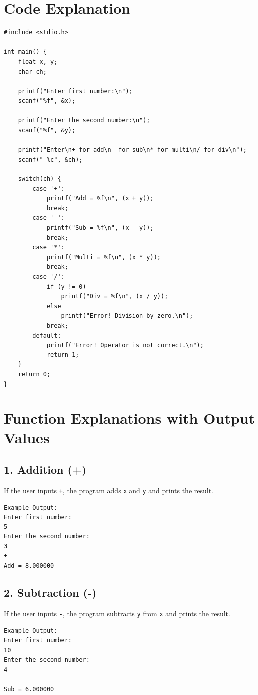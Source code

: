 \documentclass[a4paper,14pt]{article}
\begin{document}
\section*{Code Explanation}
\begin{verbatim}
#include <stdio.h>

int main() {
    float x, y;
    char ch;

    printf("Enter first number:\n");
    scanf("%f", &x);

    printf("Enter the second number:\n");
    scanf("%f", &y);

    printf("Enter\n+ for add\n- for sub\n* for multi\n/ for div\n");
    scanf(" %c", &ch);

    switch(ch) {
        case '+':
            printf("Add = %f\n", (x + y));
            break;
        case '-':
            printf("Sub = %f\n", (x - y));
            break;
        case '*':
            printf("Multi = %f\n", (x * y));
            break;
        case '/':
            if (y != 0)
                printf("Div = %f\n", (x / y));
            else
                printf("Error! Division by zero.\n");
            break;
        default:
            printf("Error! Operator is not correct.\n");
            return 1;
    }
    return 0;
}
\end{verbatim}

\section*{Function Explanations with Output Values}
\subsection*{1. Addition (+)}
If the user inputs \texttt{+}, the program adds \texttt{x} and \texttt{y} and prints the result.
\begin{verbatim}
Example Output:
Enter first number: 
5 
Enter the second number: 
3 
+ 
Add = 8.000000
\end{verbatim}

\subsection*{2. Subtraction (-)}
If the user inputs \texttt{-}, the program subtracts \texttt{y} from \texttt{x} and prints the result.
\begin{verbatim}
Example Output:
Enter first number: 
10 
Enter the second number: 
4 
- 
Sub = 6.000000
\end{verbatim}
\end{document}
